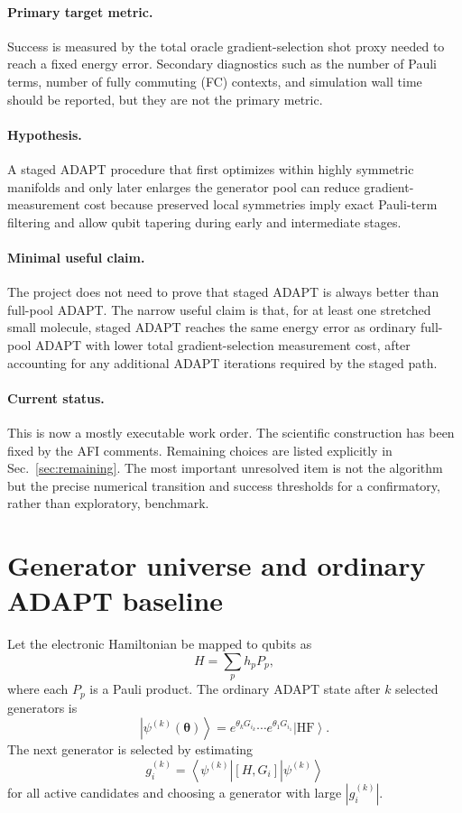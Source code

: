 \documentclass[11pt]{article}
\newcommand{\ket}[1]{\left|#1\right\rangle}
\newcommand{\bra}[1]{\left\langle#1\right|}
\newcommand{\comm}[2]{\left[#1,#2\right]}
\begin{document}
\paragraph{Primary target metric.}
Success is measured by the total oracle gradient-selection shot proxy needed to reach a fixed energy error. Secondary diagnostics such as the number of Pauli terms, number of fully commuting (FC) contexts, and simulation wall time should be reported, but they are not the primary metric.

\paragraph{Hypothesis.}
A staged ADAPT procedure that first optimizes within highly symmetric manifolds and only later enlarges the generator pool can reduce gradient-measurement cost because preserved local symmetries imply exact Pauli-term filtering and allow qubit tapering during early and intermediate stages.

\paragraph{Minimal useful claim.}
The project does not need to prove that staged ADAPT is always better than full-pool ADAPT. The narrow useful claim is that, for at least one stretched small molecule, staged ADAPT reaches the same energy error as ordinary full-pool ADAPT with lower total gradient-selection measurement cost, after accounting for any additional ADAPT iterations required by the staged path.

\paragraph{Current status.}
This is now a mostly executable work order. The scientific construction has been fixed by the AFI comments. Remaining choices are listed explicitly in Sec.~\ref{sec:remaining}. The most important unresolved item is not the algorithm but the precise numerical transition and success thresholds for a confirmatory, rather than exploratory, benchmark.

\section{Generator universe and ordinary ADAPT baseline}

Let the electronic Hamiltonian be mapped to qubits as
\begin{equation}
    H = \sum_p h_p P_p,
\end{equation}
where each $P_p$ is a Pauli product. The ordinary ADAPT state after $k$ selected generators is
\begin{equation}
    \ket{\psi^{(k)}(\bm\theta)}
    = e^{\theta_k G_{i_k}}\cdots e^{\theta_1 G_{i_1}}\ket{\mathrm{HF}}.
\end{equation}
The next generator is selected by estimating
\begin{equation}
    g_i^{(k)} = \bra{\psi^{(k)}}\comm{H}{G_i}\ket{\psi^{(k)}}
\end{equation}
for all active candidates and choosing a generator with large $|g_i^{(k)}|$.
\end{document}
